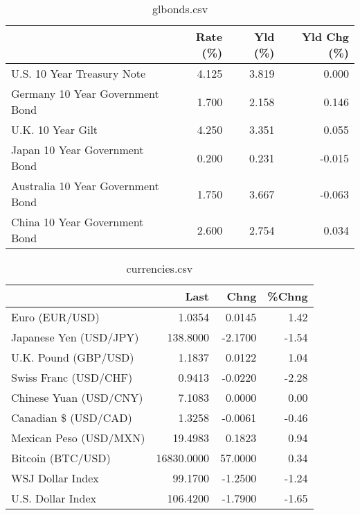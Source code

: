 \documentclass{article}%
\begin{document}
%


\begin{table}[htbp]%
\caption{glbonds.csv}%
\centering%
\begin{adjustbox}{width=1\textwidth}%
\begin{tabular}{lrrr}
\toprule
                                  &  Rate (\%) &  Yld (\%) &  Yld Chg (\%) \\
\midrule
       U.S. 10 Year Treasury Note &     4.125 &    3.819 &        0.000 \\
  Germany 10 Year Government Bond &     1.700 &    2.158 &        0.146 \\
                U.K. 10 Year Gilt &     4.250 &    3.351 &        0.055 \\
    Japan 10 Year Government Bond &     0.200 &    0.231 &       -0.015 \\
Australia 10 Year Government Bond &     1.750 &    3.667 &       -0.063 \\
    China 10 Year Government Bond &     2.600 &    2.754 &        0.034 \\
\bottomrule
\end{tabular}
%
\end{adjustbox}%
\end{table}

%


\begin{table}[htbp]%
\caption{currencies.csv}%
\centering%
\begin{adjustbox}{width=1\textwidth}%
\begin{tabular}{lrrr}
\toprule
                       &       Last &    Chng &  \%Chng \\
\midrule
        Euro (EUR/USD) &     1.0354 &  0.0145 &   1.42 \\
Japanese Yen (USD/JPY) &   138.8000 & -2.1700 &  -1.54 \\
  U.K. Pound (GBP/USD) &     1.1837 &  0.0122 &   1.04 \\
 Swiss Franc (USD/CHF) &     0.9413 & -0.0220 &  -2.28 \\
Chinese Yuan (USD/CNY) &     7.1083 &  0.0000 &   0.00 \\
  Canadian \$ (USD/CAD) &     1.3258 & -0.0061 &  -0.46 \\
Mexican Peso (USD/MXN) &    19.4983 &  0.1823 &   0.94 \\
     Bitcoin (BTC/USD) & 16830.0000 & 57.0000 &   0.34 \\
      WSJ Dollar Index &    99.1700 & -1.2500 &  -1.24 \\
     U.S. Dollar Index &   106.4200 & -1.7900 &  -1.65 \\
\bottomrule
\end{tabular}
%
\end{adjustbox}%
\end{table}

%
\end{document}
